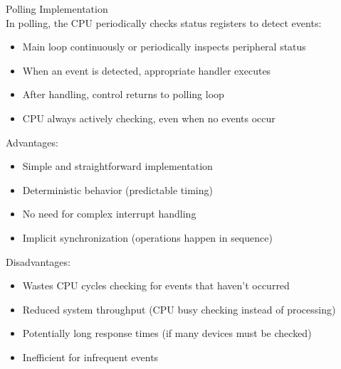 \begin{concept}{Polling Implementation}\\
In polling, the CPU periodically checks status registers to detect events:
\begin{itemize}
    \item Main loop continuously or periodically inspects peripheral status
    \item When an event is detected, appropriate handler executes
    \item After handling, control returns to polling loop
    \item CPU always actively checking, even when no events occur
\end{itemize}

Advantages:
\begin{itemize}
    \item Simple and straightforward implementation
    \item Deterministic behavior (predictable timing)
    \item No need for complex interrupt handling
    \item Implicit synchronization (operations happen in sequence)
\end{itemize}

Disadvantages:
\begin{itemize}
    \item Wastes CPU cycles checking for events that haven't occurred
    \item Reduced system throughput (CPU busy checking instead of processing)
    \item Potentially long response times (if many devices must be checked)
    \item Inefficient for infrequent events
\end{itemize}
\end{concept}

